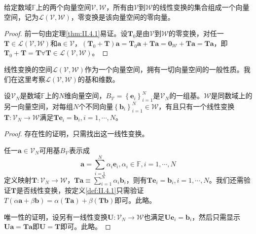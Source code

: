 \documentclass[main.tex]{subfiles}
\begin{document}
\begin{corollary}
给定数域$\mathbb{F}$上的两个向量空间$\mathcal{V},\mathcal{W}$，所有由$\mathcal{V}$到$\mathcal{W}$的线性变换的集合组成一个向量空间，记为$\mathcal{L}\left(\mathcal{V},\mathcal{W}\right)$，零变换是该向量空间的零向量。
\end{corollary}
\begin{proof}
前一句由定理\ref{thm:II.4.1}易证。设$\mathbf{T}_0$是由$\mathcal{V}$到$\mathcal{W}$的零变换，对任一$\mathbf{T}\in\mathcal{L}\left(\mathcal{V},\mathcal{W}\right)$和$\mathbf{a}\in\mathcal{V}$，$\left(\mathbf{T}_0+\mathbf{T}\right)\mathbf{a}=\mathbf{T}_0\mathbf{a}+\mathbf{Ta}=\mathbf{0}_\mathcal{W}+\mathbf{Ta}=\mathbf{Ta}$，即$\mathbf{T}_0+\mathbf{T}=\mathbf{T}\forall\mathbf{T}\in\mathcal{L}\left(\mathcal{V},\mathcal{W}\right)$。
\end{proof}

线性变换的空间$\mathcal{L}\left(\mathcal{V},\mathcal{W}\right)$作为一个向量空间，拥有一切向量空间的一般性质。我们在这里考察$\mathcal{L}\left(\mathcal{V},\mathcal{W}\right)$的基和维数。

\begin{theorem}\label{thm:II.4.2}
设$\mathcal{V}_N$是数域$\mathbb{F}$上的$N$维向量空间，$B_\mathcal{V}=\left\{\mathbf{e}_i\right\}_{i=1}^N$是$\mathcal{V}_N$的一组基。$\mathcal{W}$是同数域上的另一向量空间，对每组$N$个不同向量$\left\{\mathbf{b}_i\right\}_{i=1}^N\in\mathcal{W}$，有且只有一个线性变换$\mathbf{T}:\mathcal{V}_N\rightarrow\mathcal{W}$满足$\mathbf{Te}_i=\mathbf{b}_i,i=1,\cdots,N$。
\end{theorem}
\begin{proof}
存在性的证明，只需找出这一线性变换。

任一$\mathbf{a}\in\mathcal{V}_N$可用基$B_\mathcal{V}$表示成
\[\mathbf{a}=\sum_{i=1}^N\alpha_i\mathbf{e}_i,\alpha_i\in\mathbb{F},i=1,\cdots,N\]
定义映射$\mathbf{T}:\mathcal{V}_N\rightarrow\mathcal{W}，\mathbf{Ta}\equiv\sum_{i=1}^N\alpha_i\mathbf{b}_i$，则有$\mathbf{Te}_i=\mathbf{b}_i,i=1,\cdots,N$。我们还需验证$\mathbf{T}$是否线性变换，按定义\ref{def:II.4.1}只需验证$T\left(\alpha\mathbf{a}+\beta\mathbf{b}\right)=\alpha\left(\mathbf{Ta}\right)+\beta\left(\mathbf{Tb}\right)$即可。此略。

唯一性的证明，设另有一线性变换$\mathbf{U}:\mathcal{V}_N\rightarrow\mathcal{W}$也满足$\mathbf{Ue}_i=\mathbf{b}_i$，然后只需显示$\mathbf{Ua}=\mathbf{Ta}$即$\mathbf{U}=\mathbf{T}$即可。此略。
\end{proof}
\end{document}
